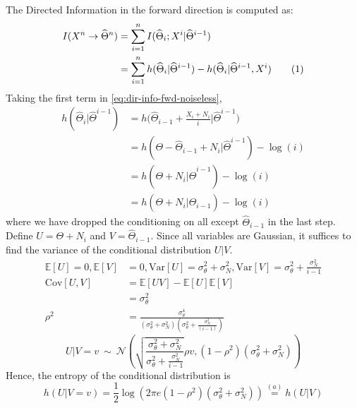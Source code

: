 \documentclass[letterpaper, 10pt, conference]{ieeeconf}
\newcommand\numberthis{\stepcounter{equation}\tag{\theequation}}
\begin{document}
The Directed Information in the forward direction is computed as:
\begin{align*}
	I(X^n \rightarrow \widehat\Theta^n) &= \sum_{i=1}^n{I(\widehat\Theta_i ; X^i | \widehat\Theta^{i-1})} \\
										&= \sum_{i=1}^n{h(\widehat\Theta_i | \widehat\Theta^{i-1}) - h(\widehat\Theta_i | \widehat\Theta^{i-1}, X^i)} \numberthis \label{eq:dir-info-fwd-noiseless}
\end{align*}
Taking the first term in \eqref{eq:dir-info-fwd-noiseless},
\begin{align*}
	h(\widehat\Theta_i | \widehat\Theta^{i-1}) &= h \bigg( \widehat\Theta_{i-1} + \frac{X_i + N_i}{i} \bigg| \widehat\Theta^{i-1} \bigg) \\
											   &= h(\Theta - \widehat\Theta_{i-1} + N_i | \widehat\Theta^{i-1}) -\log(i) \\
											   &= h(\Theta + N_i | \widehat\Theta^{i-1}) -\log(i) \\
											   &= h(\Theta + N_i | \widehat\Theta_{i-1}) -\log(i)
\end{align*}
where we have dropped the conditioning on all except $\widehat\Theta_{i-1}$ in the last step. %
Define $U = \Theta + N_i$ and $V = \widehat\Theta_{i-1}$. Since all variables are Gaussian, it suffices to find the variance of the conditional distribution $U|V$.
\begin{align*}
	\mathbb{E}[U] = 0,
	\mathbb{E}[V] &= 0, \text{Var}[U] = \sigma_\theta^2 + \sigma_N^2,
	\text{Var}[V] = \sigma_\theta^2+ \frac{\sigma_N^2}{i-1} \\
	\text{Cov}[U,V] &= \mathbb{E}[UV]-\mathbb{E}[U]\mathbb{E}[V] \\
					&= \sigma_\theta^2 \\
	\rho^{2}        &= \frac{\sigma_{\theta}^{4}}{(\sigma_{\theta}^{2}+\sigma_{N}^{2})(\sigma_{\theta}^{2}+\frac{\sigma_{N}^{2}}{(i-1)})}
\end{align*}
\begin{equation*}
	U|V=v\ \sim\ \mathcal{N}\left(\sqrt{\frac{\sigma_{\theta}^{2}+\sigma_{N}^{2}}{\sigma_{\theta}^{2}+\frac{\sigma_{N}^{2}}{i-1}}}\rho v,(1-\rho^{2})(\sigma_{\theta}^{2}+\sigma_{N}^{2})\right)
\end{equation*}
Hence, the entropy of the conditional distribution is
\begin{equation*}
	h(U|V=v)=\frac{1}{2}\log(2\pi e(1-\rho^{2})(\sigma_{\theta}^{2}+\sigma_{N}^{2})) \overset{(a)}{=} h(U|V)
\end{equation*}
\end{document}

